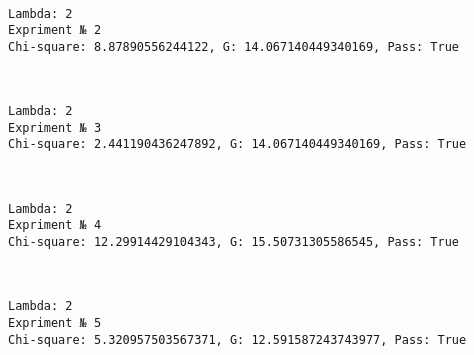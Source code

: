 \documentclass[11pt]{article}
\begin{document}
    \begin{center}
    \end{center}
    { \hspace*{\fill} \\}
    
    \begin{Verbatim}[commandchars=\\\{\}]
Lambda: 2
Expriment № 2
Chi-square: 8.87890556244122, G: 14.067140449340169, Pass: True
    \end{Verbatim}

    \begin{center}
    \end{center}
    { \hspace*{\fill} \\}
    
    \begin{Verbatim}[commandchars=\\\{\}]
Lambda: 2
Expriment № 3
Chi-square: 2.441190436247892, G: 14.067140449340169, Pass: True
    \end{Verbatim}

    \begin{center}
    \end{center}
    { \hspace*{\fill} \\}
    
    \begin{Verbatim}[commandchars=\\\{\}]
Lambda: 2
Expriment № 4
Chi-square: 12.29914429104343, G: 15.50731305586545, Pass: True
    \end{Verbatim}

    \begin{center}
    \end{center}
    { \hspace*{\fill} \\}
    
    \begin{Verbatim}[commandchars=\\\{\}]
Lambda: 2
Expriment № 5
Chi-square: 5.320957503567371, G: 12.591587243743977, Pass: True
    \end{Verbatim}
\end{document}
